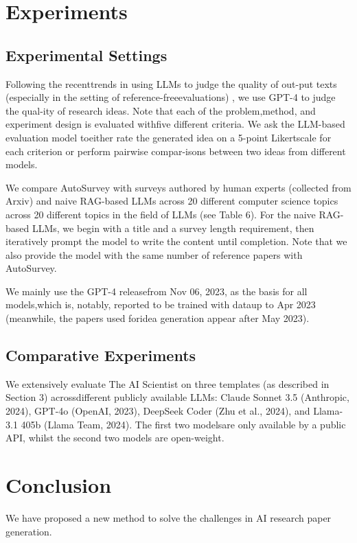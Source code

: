 \documentclass[manuscript,review,anonymous]{acmart}
\begin{document}
\section{Experiments}

\subsection{Experimental Settings}

Following the recenttrends in using LLMs to judge the quality of out-put texts (especially in the setting of reference-freeevaluations) \cite{zheng2023judging,liu2023g}, we use GPT-4 to judge the qual-ity of research ideas. Note that each of the problem,method, and experiment design is evaluated withfive different criteria. We ask the LLM-based evaluation model toeither rate the generated idea on a 5-point Likertscale for each criterion or perform pairwise compar-isons between two ideas from different models. 

We compare AutoSurvey with surveys authored by human experts (collected from Arxiv) and naive RAG-based LLMs across 20 different computer science topics across 20 different topics in
the field of LLMs (see Table 6). For the naive RAG-based LLMs, we begin with a title and a survey
length requirement, then iteratively prompt the model to write the content until completion. Note that we also provide the model with the same number of reference papers with AutoSurvey.

We mainly use the GPT-4 \cite{achiam2023gpt} releasefrom Nov 06, 2023, as the basis for all models,which is, notably, reported to be trained with dataup to Apr 2023 (meanwhile, the papers used foridea generation appear after May 2023).

\subsection{Comparative Experiments}

We extensively evaluate The AI Scientist on three templates (as described in Section 3) acrossdifferent publicly available LLMs: Claude Sonnet 3.5 (Anthropic, 2024), GPT-4o (OpenAI, 2023), DeepSeek Coder (Zhu et al., 2024), and Llama-3.1 405b (Llama Team, 2024).  The first two modelsare only available by a public API, whilst the second two models are open-weight. 


\section{Conclusion}

We have proposed a new method to solve the challenges in AI research paper generation.



\end{document}
